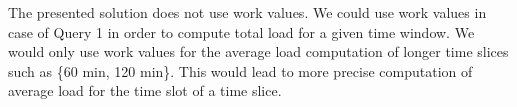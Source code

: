 The presented solution does not use work values.
We could use work values in case of Query 1 in order to compute total load for a given time window.
We would only use work values for the average load computation of longer time slices such as \{60 min, 120 min\}.
This would lead to more precise computation of average load for the time slot of a time slice.

